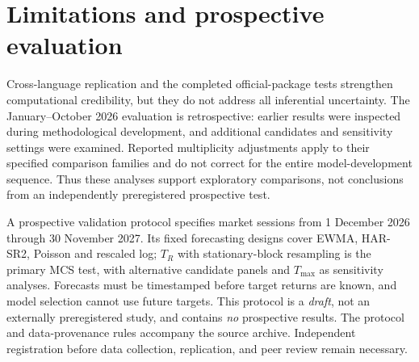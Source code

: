 \section{Limitations and prospective evaluation}\label{sec:prospective}
Cross-language replication and the completed official-package tests strengthen
computational credibility, but they do not address all inferential uncertainty.
The January--October 2026 evaluation is retrospective: earlier results were
inspected during methodological development, and additional candidates and
sensitivity settings were examined. Reported multiplicity adjustments apply
to their specified comparison families and do not correct for the entire
model-development sequence. Thus these analyses support exploratory
comparisons, not conclusions from an independently preregistered prospective
test.

A prospective validation protocol specifies market sessions from 1 December
2026 through 30 November 2027. Its fixed forecasting designs cover EWMA,
HAR-SR2, Poisson and rescaled log; $T_R$ with stationary-block resampling is
the primary MCS test, with alternative candidate panels and $T_{\max}$ as
sensitivity analyses. Forecasts must be timestamped before target returns
are known, and model selection cannot use future targets. This protocol is a
\emph{draft}, not an externally preregistered study, and contains \emph{no}
prospective results. The protocol and data-provenance rules accompany the
source archive. Independent registration before data collection, replication,
and peer review remain necessary.

\clearpage

